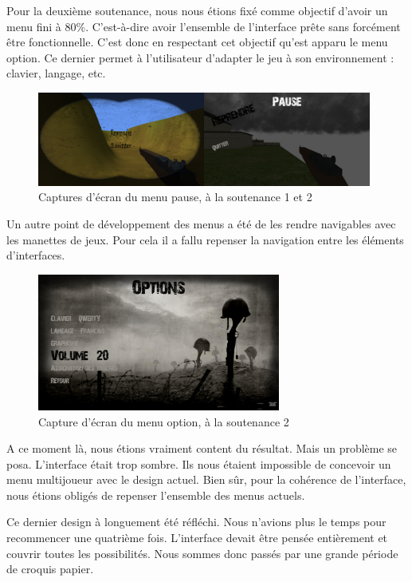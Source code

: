 \documentclass[11pt]{report}
\begin{document}
Pour la deuxième soutenance, nous nous étions fixé comme objectif d'avoir un menu fini à 80\%. C'est-à-dire avoir l'ensemble de l'interface prête sans forcément être fonctionnelle. C'est donc en respectant cet objectif qu'est apparu le menu option. Ce dernier permet à l'utilisateur d'adapter le jeu à son environnement : clavier, langage, etc.

\begin{figure}[htbp]
\centering
\includegraphics[width=11cm]{menu-pause-1et2.png}
\caption{Captures d'écran du menu pause, à la soutenance 1 et 2}
\end{figure}

Un autre point de développement des menus a été de les rendre navigables avec les manettes de jeux. Pour cela il a fallu repenser la navigation entre les éléments d'interfaces.

\begin{figure}[htbp]
\centering
\includegraphics[width=8cm]{option-menu-2.jpg}
\caption{Capture d'écran du menu option, à la soutenance 2}
\end{figure}

A ce moment là, nous étions vraiment content du résultat. Mais un problème se posa. L'interface était trop sombre. Ils nous étaient impossible de concevoir un menu multijoueur avec le design actuel. Bien sûr, pour la cohérence de l'interface, nous étions obligés de repenser l'ensemble des menus actuels.

Ce dernier design à longuement été réfléchi. Nous n'avions plus le temps pour recommencer une quatrième fois. L'interface devait être pensée entièrement et couvrir toutes les possibilités. Nous sommes donc passés par une grande période de croquis papier.
\end{document}
